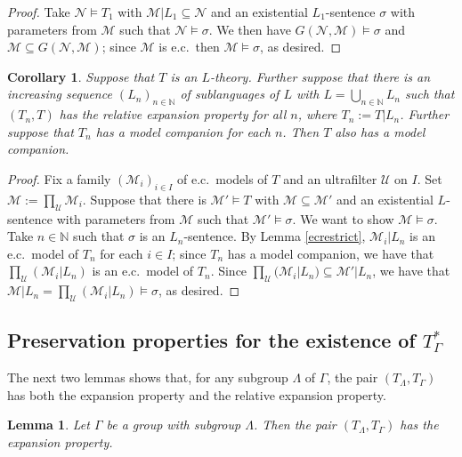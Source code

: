 \documentclass[12pt]{amsart}
\newtheorem{lem}[thm]{Lemma}
\newtheorem{cor}[thm]{Corollary}
\theoremstyle{definition}
\def\bb{\mathbb}
\def\bb{\mathbb}
\def\cal{\mathcal}
\def\u{\mathsf 1}
\def \u{\mathcal U}
\begin{document}
\begin{proof}
Take $\cal N\models T_1$ with $\cal M|L_1\subseteq \cal N$ and an existential $L_1$-sentence $\sigma$ with parameters from $\cal M$ such that $\cal N\models \sigma$.  We then have $G(\cal N,\cal M)\models \sigma$ and $\cal M\subseteq G(\cal N,\cal M)$; since $\cal M$ is e.c.\, then $\cal M\models \sigma$, as desired.
\end{proof}

\begin{cor}\label{mclocal}
Suppose that $T$ is an $L$-theory.  Further suppose that there is an increasing sequence $(L_n)_{n\in \bb N}$ of sublanguages of $L$ with $L=\bigcup_{n\in \bb N}L_n$ such that $(T_n,T)$ has the relative expansion property for all $n$, where $T_n:=T|L_n$.  Further suppose that $T_n$ has a model companion for each $n$.  Then $T$ also has a model companion.
\end{cor}

\begin{proof}
Fix a family $(\cal M_i)_{i\in I}$ of e.c.\ models of $T$ and an ultrafilter $\u$ on $I$.  Set $\cal M:=\prod_\u \cal M_i$.  Suppose that there is  $\cal M'\models T$ with $\cal M\subseteq \cal M'$ and an existential $L$-sentence with parameters from $\cal M$ such that $\cal M'\models \sigma$.  We want to show $\cal M\models \sigma$.  Take $n\in \bb N$ such that $\sigma$ is an $L_n$-sentence.  By Lemma \ref{ecrestrict}, $\cal M_i|L_n$ is an e.c.\ model of $T_n$ for each $i\in I$; since $T_n$ has a model companion, we have that $\prod_\u (\cal M_i|L_n)$ is an e.c.\ model of $T_n$.  Since $\prod_\u (\cal M_i|L_n)\subseteq \cal M'|L_n$, we have that $\cal M|L_n=\prod_\u (\cal M_i|L_n)\models \sigma$, as desired.
\end{proof}

\subsection{Preservation properties for the existence of \texorpdfstring{$T_\Gamma^*$}{the model companion}}

The next two lemmas shows that, for any subgroup $\Lambda$ of $\Gamma$, the pair $(T_\Lambda,T_\Gamma)$ has both the expansion property and the relative expansion property.

\begin{lem}\label{expgroups}
Let $\Gamma$ be a group with subgroup $\Lambda$.  Then the pair $(T_\Lambda,T_\Gamma)$ has the expansion property. 
\end{lem}
\end{document}
